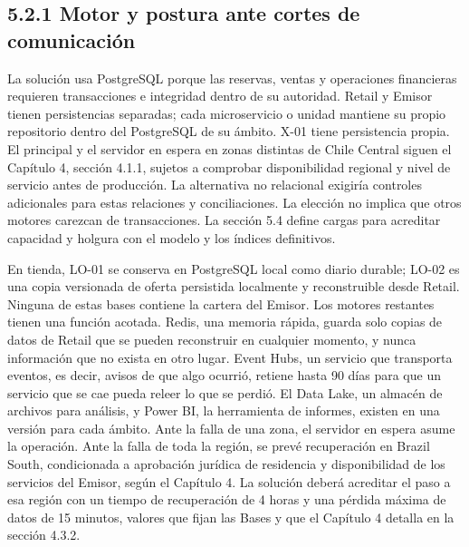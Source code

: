 \documentclass[11pt]{article}
\begin{document}
\subsection{5.2.1 Motor y postura ante cortes de comunicación}

La solución usa PostgreSQL porque las reservas, ventas y operaciones financieras requieren transacciones e integridad dentro de su autoridad. Retail y Emisor tienen persistencias separadas; cada microservicio o unidad mantiene su propio repositorio dentro del PostgreSQL de su ámbito. X-01 tiene persistencia propia. El principal y el servidor en espera en zonas distintas de Chile Central siguen el Capítulo 4, sección 4.1.1, sujetos a comprobar disponibilidad regional y nivel de servicio antes de producción. La alternativa no relacional exigiría controles adicionales para estas relaciones y conciliaciones. La elección no implica que otros motores carezcan de transacciones. La sección 5.4 define cargas para acreditar capacidad y holgura con el modelo y los índices definitivos.

En tienda, LO-01 se conserva en PostgreSQL local como diario durable; LO-02 es una copia versionada de oferta persistida localmente y reconstruible desde Retail. Ninguna de estas bases contiene la cartera del Emisor. Los motores restantes tienen una función acotada. Redis, una memoria rápida, guarda solo copias de datos de Retail que se pueden reconstruir en cualquier momento, y nunca información que no exista en otro lugar. Event Hubs, un servicio que transporta eventos, es decir, avisos de que algo ocurrió, retiene hasta 90 días para que un servicio que se cae pueda releer lo que se perdió. El Data Lake, un almacén de archivos para análisis, y Power BI, la herramienta de informes, existen en una versión para cada ámbito. Ante la falla de una zona, el servidor en espera asume la operación. Ante la falla de toda la región, se prevé recuperación en Brazil South, condicionada a aprobación jurídica de residencia y disponibilidad de los servicios del Emisor, según el Capítulo 4. La solución deberá acreditar el paso a esa región con un tiempo de recuperación de 4 horas y una pérdida máxima de datos de 15 minutos, valores que fijan las Bases y que el Capítulo 4 detalla en la sección 4.3.2.
\end{document}
